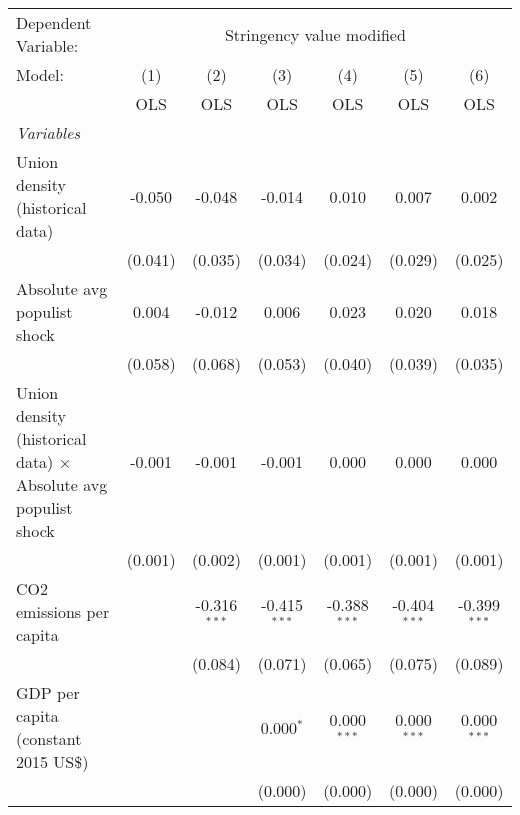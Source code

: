 
\begingroup
\centering
\begin{tabular}{lcccccc}
   \toprule
   Dependent Variable: & \multicolumn{6}{c}{Stringency value modified}\\
   Model:                                                                & (1)     & (2)            & (3)            & (4)            & (5)            & (6)\\  
                                                                         &  OLS    & OLS            & OLS            & OLS            & OLS            & OLS\\  
   \midrule
   \emph{Variables}\\
   Union density (historical data)                                       & -0.050  & -0.048         & -0.014         & 0.010          & 0.007          & 0.002\\   
                                                                         & (0.041) & (0.035)        & (0.034)        & (0.024)        & (0.029)        & (0.025)\\   
   Absolute avg populist shock                                           & 0.004   & -0.012         & 0.006          & 0.023          & 0.020          & 0.018\\   
                                                                         & (0.058) & (0.068)        & (0.053)        & (0.040)        & (0.039)        & (0.035)\\   
   Union density (historical data) $\times$ Absolute avg populist shock  & -0.001  & -0.001         & -0.001         & 0.000          & 0.000          & 0.000\\   
                                                                         & (0.001) & (0.002)        & (0.001)        & (0.001)        & (0.001)        & (0.001)\\   
   CO2 emissions per capita                                              &         & -0.316$^{***}$ & -0.415$^{***}$ & -0.388$^{***}$ & -0.404$^{***}$ & -0.399$^{***}$\\   
                                                                         &         & (0.084)        & (0.071)        & (0.065)        & (0.075)        & (0.089)\\   
   GDP per capita (constant 2015 US\$)                                   &         &                & 0.000$^{*}$    & 0.000$^{***}$  & 0.000$^{***}$  & 0.000$^{***}$\\   
                                                                         &         &                & (0.000)        & (0.000)        & (0.000)        & (0.000)\\   

\end{tabular}
